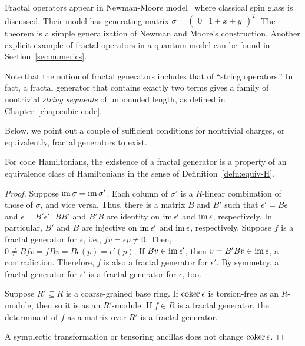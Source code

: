 Fractal operators appear in Newman-Moore model~\cite{NewmanMoore1999Glassy} where classical spin glass is discussed.
Their model has generating matrix $\sigma = \begin{pmatrix} 0 & 1+x+y \end{pmatrix}^T$.
The theorem is a simple generalization of Newman and Moore's construction.
Another explicit example of fractal operators 
in a quantum model can be found in Section~\ref{sec:numerics}.

Note that the notion of fractal generators includes that of ``string operators.''
In fact, a fractal generator that contains exactly two terms
gives a family of nontrivial {\em string segments} of unbounded length,
as defined in Chapter~\ref{chap:cubic-code}.


Below, we point out a couple of sufficient conditions 
for nontrivial charges, or equivalently, fractal generators to exist.
\begin{prop}
For code Hamiltonians,
the existence of a fractal generator is a property of an equivalence class of Hamiltonians
in the sense of Definition~\ref{defn:equiv-H}.
\label{prop:fractal-property-of-eq-class}
\end{prop}
\begin{proof}
Suppose $\mathop{\mathrm{im}}\nolimits \sigma = \mathop{\mathrm{im}}\nolimits \sigma'$.
Each column of $\sigma'$ is a $R$-linear combination of those of $\sigma$, and vice versa.
Thus, there is a matrix $B$ and $B'$ such that $\epsilon' = B\epsilon$ and $\epsilon = B' \epsilon'$.
$BB'$ and $B'B$ are identity on $\mathop{\mathrm{im}}\nolimits \epsilon'$ and $\mathop{\mathrm{im}}\nolimits \epsilon$, respectively.
In particular, $B'$ and $B$ are injective on $\mathop{\mathrm{im}}\nolimits \epsilon'$ and $\mathop{\mathrm{im}}\nolimits \epsilon$, respectively.
Suppose $f$ is a fractal generator for $\epsilon$, i.e., $fv = \epsilon p \ne 0$.
Then, $0 \ne Bfv = f B v = B\epsilon(p) = \epsilon'(p)$.
If $Bv \in \mathop{\mathrm{im}}\nolimits \epsilon'$, then $v = B'Bv \in \mathop{\mathrm{im}}\nolimits \epsilon$, a contradiction.
Therefore, $f$ is also a fractal generator for $\epsilon'$.
By symmetry, a fractal generator for $\epsilon'$ is a fractal generator for $\epsilon$, too.

Suppose $R' \subseteq R$ is a coarse-grained base ring.
If $\mathop{\mathrm{coker}}\nolimits \epsilon$ is torsion-free as an $R$-module,
then so it is as an $R'$-module.
If $f \in R$ is a fractal generator,
the determinant of $f$ as a matrix over $R'$ is a fractal generator.

A symplectic transformation or tensoring ancillas
does not change $\mathop{\mathrm{coker}}\nolimits \epsilon$.
\end{proof}


